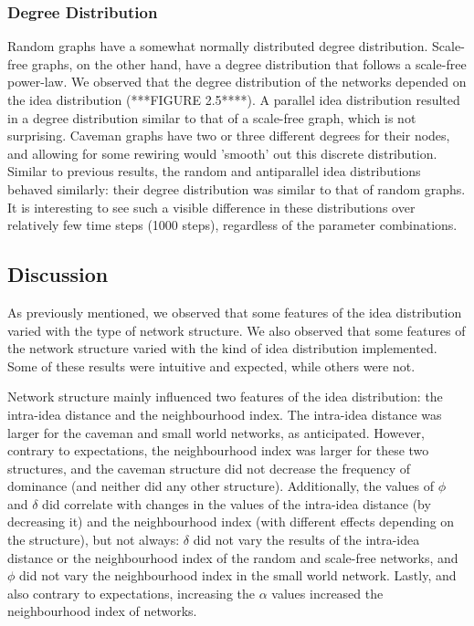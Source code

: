 \subsubsection{Degree Distribution}
Random graphs have a somewhat normally distributed degree distribution. Scale-free graphs, on the other hand, have a degree distribution that follows a scale-free power-law. We observed that the degree distribution of the networks depended on the idea distribution (***FIGURE 2.5****). A parallel idea distribution resulted in a degree distribution similar to that of a scale-free graph, which is not surprising. Caveman graphs have two or three different degrees for their nodes, and allowing for some rewiring would 'smooth' out this discrete distribution. Similar to previous results, the random and antiparallel idea distributions behaved similarly: their degree distribution was similar to that of random graphs. It is interesting to see such a visible difference in these distributions over relatively few time steps (1000 steps), regardless of the parameter combinations. 


\subsection{Discussion}

As previously mentioned, we observed that some features of the idea distribution varied with the type of network structure. We also observed that some features of the network structure varied with the kind of idea distribution implemented. Some of these results were intuitive and expected, while others were not.

Network structure mainly influenced two features of the idea distribution: the intra-idea distance and the neighbourhood index. The intra-idea distance was larger for the caveman and small world networks, as anticipated. However, contrary to expectations, the neighbourhood index was larger for these two structures, and the caveman structure did not decrease the frequency of dominance (and neither did any other structure).  Additionally, the values of $\phi$ and $\delta$ did correlate with changes in the values of the intra-idea distance (by decreasing it) and the neighbourhood index (with different effects depending on the structure), but not always: $\delta$ did not vary the results of the intra-idea distance or the neighbourhood index of the random and scale-free networks, and $\phi$ did not vary the neighbourhood index in the small world network. Lastly, and also contrary to expectations, increasing the $\alpha$ values increased the neighbourhood index of networks.


